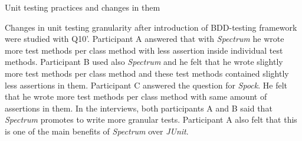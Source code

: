     \begin{table}[H]
             \caption {Unit testing practices and changes in them} \label{tab:changes-pt8}
     \end{table}

Changes in unit testing granularity after introduction of BDD-testing framework were studied with Q10'. Participant A
answered that with \textit{Spectrum} he wrote more test methods per class method with less assertion inside individual
test methods. Participant B used also \textit{Spectrum} and he felt that he wrote slightly more test methods per class method and
these test methods contained slightly less assertions in them.
Participant C answered the question for \textit{Spock}. He felt that he wrote more test methods per class method with same amount of assertions in them.
In the interviews, both participants A and B said that
\textit{Spectrum} promotes to write more granular tests. Participant A also felt that this is one of the main benefits of \textit{Spectrum} over
\textit{JUnit}.

